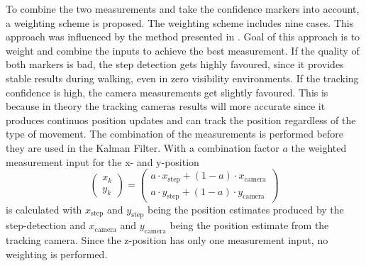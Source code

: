 \documentclass[engproc,conferenceproceedings,submit,pdftex,moreauthors]{Definitions/mdpi}
\begin{document}
%	



To combine the two measurements and take the confidence markers into account, a weighting scheme is proposed. The weighting scheme includes nine cases. This approach was influenced by the method presented in \cite{caron2006}. Goal of this approach is to weight and combine the inputs to achieve the best measurement.  If the quality of both markers is bad, the step detection gets highly favoured, since it provides stable results during walking, even in zero visibility environments. If the tracking confidence is high, the camera measurements get slightly favoured. This is because in theory the tracking cameras results will more accurate since it produces continuos position updates and can track the position regardless of the type of movement. %
The combination of the measurements is performed before they are used in the Kalman Filter. With a combination factor  $a$ the weighted measurement input for the x- and y-position
\begin{equation}
	\begin{pmatrix}
		x_k\\
		y_k
	\end{pmatrix} =
	\begin{pmatrix}
		a\cdot x_{\text{step}} + (1-a)\cdot x_{\text{camera}}\\
		a\cdot y_{\text{step}} + (1-a)\cdot y_{\text{camera}}
	\end{pmatrix}
\end{equation}  
is calculated with $x_{\text{step}}$ and $y_{\text{step}}$ being the position estimates produced by the step-detection and $x_{\text{camera}}$ and $y_{\text{camera}}$ being the position estimate from the tracking camera. Since the z-position has only one measurement input, no weighting is performed.
%	
\end{document}
